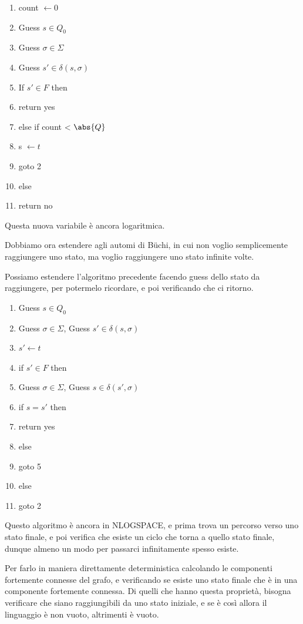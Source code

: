 \begin{enumerate}
  \item count \(\gets 0\)
  \item Guess \(s \in Q_0\)
  \item Guess \(\sigma \in \Sigma\)
  \item Guess \(s' \in \delta(s,\sigma)\)
  \item If \(s' \in F\) then
  \item   return yes
  \item else if count < \(\abs{Q}\)
  \item   s \(\gets t\)
  \item goto 2
  \item else
  \item   return no
\end{enumerate}

Questa nuova variabile è ancora logaritmica.

Dobbiamo ora estendere agli automi di Büchi, in cui non voglio semplicemente raggiungere uno stato, ma voglio raggiungere uno stato infinite volte.

Possiamo estendere l'algoritmo precedente facendo guess dello stato da raggiungere, per potermelo ricordare, e poi verificando che ci ritorno.

\begin{enumerate}
  \item Guess \(s \in Q_0\)
  \item Guess \(\sigma \in \Sigma\), Guess \(s' \in \delta(s,\sigma)\)
  \item \(s'\gets t\)
  \item if \(s' \in F\) then
  \item   Guess \(\sigma \in \Sigma\), Guess \(s \in \delta(s',\sigma)\)
  \item   if \(s = s'\) then
  \item     return yes
  \item   else
  \item     goto 5
  \item else
  \item  goto 2
\end{enumerate}

Questo algoritmo è ancora in NLOGSPACE\@, e prima trova un percorso verso uno stato finale, e poi verifica che esiste un ciclo che torna a quello stato finale, dunque almeno un modo per passarci infinitamente spesso esiste.

Per farlo in maniera direttamente deterministica calcolando le componenti fortemente connesse del grafo, e verificando se esiste uno stato finale che è in una componente fortemente connessa. Di quelli che hanno questa proprietà, bisogna verificare che siano raggiungibili da uno stato iniziale, e se è così allora il linguaggio è non vuoto, altrimenti è vuoto.

